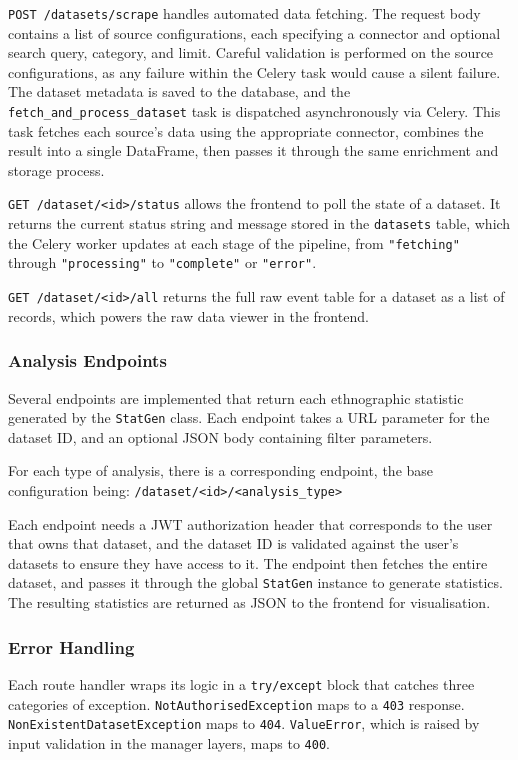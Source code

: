 \documentclass[12pt, a4paper]{article}
\begin{document}
\texttt{POST /datasets/scrape} handles automated data fetching. The request body contains a list of source configurations, each specifying a connector and optional search query, category, and limit. Careful validation is performed on the source configurations, as any failure within the Celery task would cause a silent failure. The dataset metadata is saved to the database, and the \texttt{fetch\_and\_process\_dataset} task is dispatched asynchronously via Celery. This task fetches each source's data using the appropriate connector, combines the result into a single DataFrame, then passes it through the same enrichment and storage process.

\texttt{GET /dataset/<id>/status} allows the frontend to poll the state of a dataset. It returns the current status string and message stored in the \texttt{datasets} table, which the Celery worker updates at each stage of the pipeline, from \texttt{"fetching"} through \texttt{"processing"} to \texttt{"complete"} or \texttt{"error"}.

\texttt{GET /dataset/<id>/all} returns the full raw event table for a dataset as a list of records, which powers the raw data viewer in the frontend.

\subsubsection{Analysis Endpoints}
Several endpoints are implemented that return each ethnographic statistic generated by the \texttt{StatGen} class. Each endpoint takes a URL parameter for the dataset ID, and an optional JSON body containing filter parameters.

For each type of analysis, there is a corresponding endpoint, the base configuration being: \texttt{/dataset/<id>/<analysis\_type>}

Each endpoint needs a JWT authorization header that corresponds to the user that owns that dataset, and the dataset ID is validated against the user's datasets to ensure they have access to it. The endpoint then fetches the entire dataset, and passes it through the global \texttt{StatGen} instance to generate statistics. The resulting statistics are returned as JSON to the frontend for visualisation.

\subsubsection{Error Handling}
Each route handler wraps its logic in a \texttt{try/except} block that catches three categories of exception. \texttt{NotAuthorisedException} maps to a \texttt{403} response. \texttt{NonExistentDatasetException} maps to \texttt{404}. \texttt{ValueError}, which is raised by input validation in the manager layers, maps to \texttt{400}. 
\end{document}
